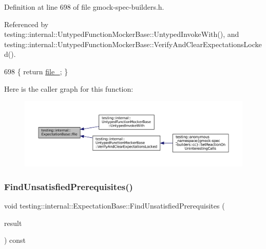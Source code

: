 Definition at line 698 of file gmock-\/spec-\/builders.\+h.



Referenced by testing\+::internal\+::\+Untyped\+Function\+Mocker\+Base\+::\+Untyped\+Invoke\+With(), and testing\+::internal\+::\+Untyped\+Function\+Mocker\+Base\+::\+Verify\+And\+Clear\+Expectations\+Locked().


\begin{DoxyCode}
698 \{ \textcolor{keywordflow}{return} \hyperlink{classtesting_1_1internal_1_1ExpectationBase_afabf690537298bbb84e9b443f62d7e97}{file\_}; \}
\end{DoxyCode}
Here is the caller graph for this function\+:
\nopagebreak
\begin{figure}[H]
\begin{center}
\leavevmode
\includegraphics[width=350pt]{classtesting_1_1internal_1_1ExpectationBase_ad8aae77623dbddd5d2099ea6499eda53_icgraph}
\end{center}
\end{figure}
\mbox{\label{classtesting_1_1internal_1_1ExpectationBase_a9eb518c079f950a59c67e8012d3371c0}} 
\subsubsection{\texorpdfstring{Find\+Unsatisfied\+Prerequisites()}{FindUnsatisfiedPrerequisites()}}
{\footnotesize\ttfamily void testing\+::internal\+::\+Expectation\+Base\+::\+Find\+Unsatisfied\+Prerequisites (\begin{DoxyParamCaption}\item[{\hyperlink{classtesting_1_1ExpectationSet}{Expectation\+Set} $\ast$}]{result }\end{DoxyParamCaption}) const\hspace{0.3cm}{\ttfamily [protected]}}



